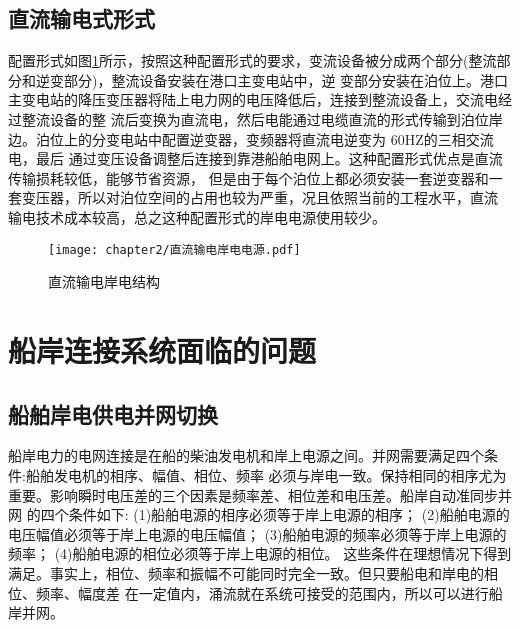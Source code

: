 \subsection{直流输电式形式}

配置形式如图\ref{fig:直流输电岸电结构}所示，按照这种配置形式的要求，变流设备被分成两个部分(整流部分和逆变部分)，整流设备安装在港口主变电站中，逆
变部分安装在泊位上。港口主变电站的降压变压器将陆上电力网的电压降低后，连接到整流设备上，交流电经过整流设备的整
流后变换为直流电，然后电能通过电缆直流的形式传输到泊位岸边。泊位上的分变电站中配置逆变器，变频器将直流电逆变为
60HZ的三相交流电，最后 通过变压设备调整后连接到靠港船舶电网上。这种配置形式优点是直流传输损耗较低，能够节省资源，
但是由于每个泊位上都必须安装一套逆变器和一套变压器，所以对泊位空间的占用也较为严重，况且依照当前的工程水平，直流
输电技术成本较高，总之这种配置形式的岸电电源使用较少。

\begin{figure}[!htp]
	\centering
	\texttt{[image: chapter2/直流输电岸电电源.pdf]}
	\caption{直流输电岸电结构}
	\label{fig:直流输电岸电结构}
\end{figure}

\section{船岸连接系统面临的问题}
\subsection{船舶岸电供电并网切换}
船岸电力的电网连接是在船的柴油发电机和岸上电源之间。并网需要满足四个条件:船舶发电机的相序、幅值、相位、频率
必须与岸电一致。保持相同的相序尤为重要。影响瞬时电压差的三个因素是频率差、相位差和电压差。船岸自动准同步并网
的四个条件如下:
(1)船舶电源的相序必须等于岸上电源的相序；
(2)船舶电源的电压幅值必须等于岸上电源的电压幅值；
(3)船舶电源的频率必须等于岸上电源的频率；
(4)船舶电源的相位必须等于岸上电源的相位。
这些条件在理想情况下得到满足。事实上，相位、频率和振幅不可能同时完全一致。但只要船电和岸电的相位、频率、幅度差
在一定值内，涌流就在系统可接受的范围内，所以可以进行船岸并网。

